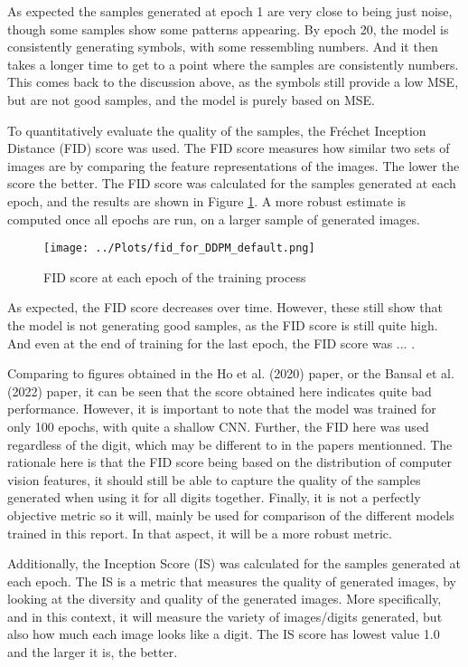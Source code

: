 \documentclass[12pt]{report} %
\begin{document}
\newpage
As expected the samples generated at epoch 1 are very close to being just noise, though some samples show some patterns appearing. By epoch 20, the model is consistently generating symbols, with some ressembling numbers. And it then takes a longer time to get to a point where the samples are consistently numbers. This comes back to the discussion above, as the symbols still provide a low MSE, but are not good samples, and the model is purely based on MSE.

To quantitatively evaluate the quality of the samples, the Fréchet Inception Distance (FID) score was used. The FID score measures how similar two sets of images are by comparing the feature representations of the images\cite{fid}. The lower the score the better. The FID score was calculated for the samples generated at each epoch, and the results are shown in Figure \ref{fig:fid_ddpm}. A more robust estimate is computed once all epochs are run, on a larger sample of generated images.


\begin{figure}[h]
  \centering
  \texttt{[image: ../Plots/fid\_for\_DDPM\_default.png]}
  \caption{FID score at each epoch of the training process}
  \label{fig:fid_ddpm}
\end{figure}

As expected, the FID score decreases over time. However, these still show that the model is not generating good samples, as the FID score is still quite high. And even at the end of training for the last epoch, the FID score was ... .

Comparing to figures obtained in the Ho et al. (2020) paper\cite{ho2020denoising}, or the Bansal et al. (2022) paper\cite{bansal2022cold}, it can be seen that the score obtained here indicates quite bad performance. However, it is important to note that the model was trained for only 100 epochs, with quite a shallow CNN. Further, the FID here was used regardless of the digit, which may be different to in the papers mentionned. The rationale here is that the FID score being based on the distribution of computer vision features\cite{fid}, it should still be able to capture the quality of the samples generated when using it for all digits together. Finally, it is not a perfectly objective metric so it will, mainly be used for comparison of the different models trained in this report. In that aspect, it will be a more robust metric.

Additionally, the Inception Score (IS) was calculated for the samples generated at each epoch. The IS is a metric that measures the quality of generated images, by looking at the diversity and quality of the generated images. More specifically, and in this context, it will measure the variety of images/digits generated, but also how much each image looks like a digit. The IS score has lowest value 1.0 and the larger it is, the better.
\end{document}

